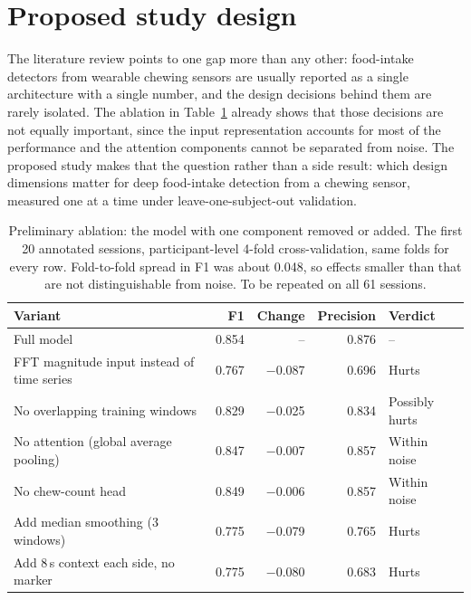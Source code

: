 \section{Proposed study design}
\label{sec:plan}

The literature review points to one gap more than any
other: food-intake detectors from wearable chewing sensors are usually
reported as a single architecture with a single number, and the design
decisions behind them are rarely isolated. The ablation in
Table~\ref{tab:ablation} already shows that those decisions are not equally
important, since the input representation accounts for most of the
performance and the attention components cannot be separated from noise.
The proposed study makes that the question rather than a side result: which
design dimensions matter for deep food-intake detection from a chewing
sensor, measured one at a time under leave-one-subject-out validation.

\begin{table}[H]
\centering
\caption{Preliminary ablation: the model with one component removed or
added. The first 20 annotated sessions, participant-level 4-fold
cross-validation, same folds for every row. Fold-to-fold spread in F1 was
about 0.048, so effects smaller than that are not distinguishable from
noise. To be repeated on all 61 sessions.}
\label{tab:ablation}
\begin{tabular}{@{}lrrrl@{}}
\toprule
\rowcolor{black!8}
\textbf{Variant} & \textbf{F1} & \textbf{Change} & \textbf{Precision} & \textbf{Verdict} \\
\midrule
Full model                             & 0.854 & --     & 0.876 & -- \\
FFT magnitude input instead of time series & 0.767 & −0.087 & 0.696 & Hurts \\
No overlapping training windows        & 0.829 & −0.025 & 0.834 & Possibly hurts \\
No attention (global average pooling)  & 0.847 & −0.007 & 0.857 & Within noise \\
No chew-count head                     & 0.849 & −0.006 & 0.857 & Within noise \\
Add median smoothing (3 windows)       & 0.775 & −0.079 & 0.765 & Hurts \\
Add 8\,s context each side, no marker  & 0.775 & −0.080 & 0.683 & Hurts \\
\bottomrule
\end{tabular}
\end{table}

